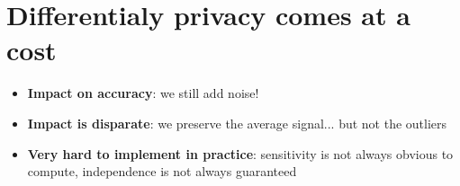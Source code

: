 \documentclass[11pt]{article}
\begin{document}
\section*{Differentialy privacy comes at a cost}
\begin{itemize}
	\item \textbf{Impact on accuracy}: we still add noise!
	\item \textbf{Impact is disparate}: we preserve the average signal... but not the outliers
	\item \textbf{Very hard to implement in practice}: sensitivity is not always obvious to compute, independence is not always guaranteed
\end{itemize}
\end{document}
